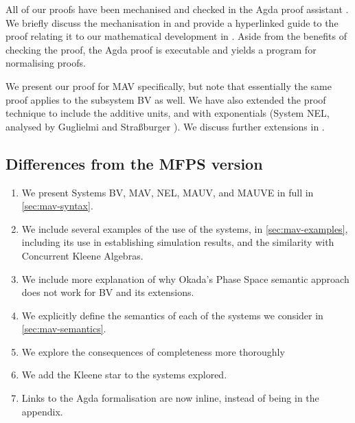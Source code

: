 All of our proofs have been mechanised and checked in the Agda proof assistant \cite{Agda264}. We briefly discuss the mechanisation in  and provide a hyperlinked guide to the proof relating it to our mathematical development in . Aside from the benefits of checking the proof, the Agda proof is executable and yields a program for normalising proofs.

We present our proof for MAV specifically, but note that essentially the same proof applies to the subsystem BV as well. We have also extended the proof technique to include the additive units, and with exponentials (System NEL, analysed by Guglielmi and Stra{\ss}burger \cite{Burger_2011,GuglielmiS11}). We discuss further extensions in .

\subsection{Differences from the MFPS version}


\begin{enumerate}
\item We present Systems BV, MAV, NEL, MAUV, and MAUVE in full in \autoref{sec:mav-syntax}.
\item We include several examples of the use of the systems, in \autoref{sec:mav-examples}, including its use in establishing simulation results, and the similarity with Concurrent Kleene Algebras.
\item We include more explanation of why Okada's Phase Space semantic approach does not work for BV and its extensions.
\item We explicitly define the semantics of each of the systems we consider in \autoref{sec:mav-semantics}.
\item We explore the consequences of completeness more thoroughly 
\item We add the Kleene star to the systems explored.
\item Links to the Agda formalisation are now inline, instead of being in the appendix.
\end{enumerate}
